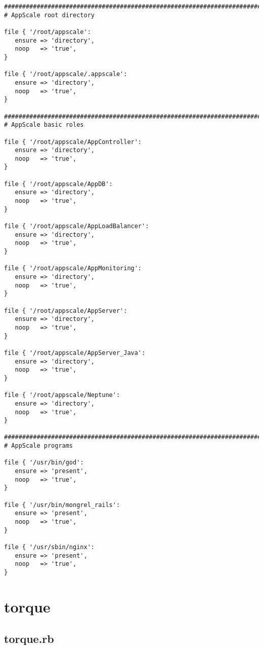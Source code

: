 \begin{lstlisting}
################################################################################
# AppScale root directory

file { '/root/appscale':
   ensure => 'directory',
   noop   => 'true',
}

file { '/root/appscale/.appscale':
   ensure => 'directory',
   noop   => 'true',
}

################################################################################
# AppScale basic roles

file { '/root/appscale/AppController':
   ensure => 'directory',
   noop   => 'true',
}

file { '/root/appscale/AppDB':
   ensure => 'directory',
   noop   => 'true',
}

file { '/root/appscale/AppLoadBalancer':
   ensure => 'directory',
   noop   => 'true',
}

file { '/root/appscale/AppMonitoring':
   ensure => 'directory',
   noop   => 'true',
}

file { '/root/appscale/AppServer':
   ensure => 'directory',
   noop   => 'true',
}

file { '/root/appscale/AppServer_Java':
   ensure => 'directory',
   noop   => 'true',
}

file { '/root/appscale/Neptune':
   ensure => 'directory',
   noop   => 'true',
}

################################################################################
# AppScale programs

file { '/usr/bin/god':
   ensure => 'present',
   noop   => 'true',
}

file { '/usr/bin/mongrel_rails':
   ensure => 'present',
   noop   => 'true',
}

file { '/usr/sbin/nginx':
   ensure => 'present',
   noop   => 'true',
}
\end{lstlisting}
\section{torque}
\subsection{torque.rb}


